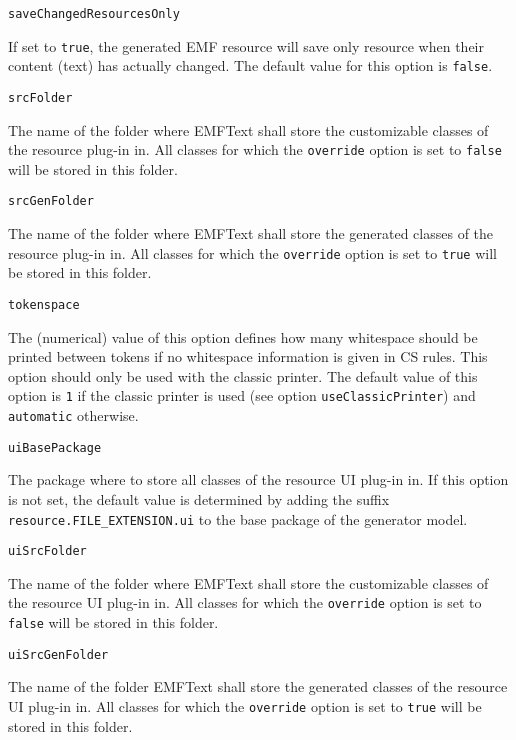 \noindent\texttt{saveChangedResourcesOnly}
\begin{myindentpar}{1cm}
If set to \texttt{true}, the generated EMF resource will save only resource when their content (text) has actually changed. The default value for this option is \texttt{false}.
\end{myindentpar}

\noindent\texttt{srcFolder}
\begin{myindentpar}{1cm}
The name of the folder where EMFText shall store the customizable classes of the resource plug-in in. All classes for which the \texttt{override} option is set to \texttt{false} will be stored in this folder.
\end{myindentpar}

\noindent\texttt{srcGenFolder}
\begin{myindentpar}{1cm}
The name of the folder where EMFText shall store the generated classes of the resource plug-in in. All classes for which the \texttt{override} option is set to \texttt{true} will be stored in this folder.
\end{myindentpar}

\noindent\texttt{tokenspace}
\begin{myindentpar}{1cm}
The (numerical) value of this option defines how many whitespace should be printed between tokens if no whitespace information is given in CS rules. This option should only be used with the classic printer. The default value of this option is \texttt{1} if the classic printer is used (see option \texttt{useClassicPrinter}) and \texttt{automatic} otherwise.
\end{myindentpar}

\noindent\texttt{uiBasePackage}
\begin{myindentpar}{1cm}
The package where to store all classes of the resource UI plug-in in. If this option is not set, the default value is determined by adding the suffix \texttt{resource.FILE\_EXTENSION.ui} to the base package of the generator model.
\end{myindentpar}

\noindent\texttt{uiSrcFolder}
\begin{myindentpar}{1cm}
The name of the folder where EMFText shall store the customizable classes of the resource UI plug-in in. All classes for which the \texttt{override} option is set to \texttt{false} will be stored in this folder.
\end{myindentpar}

\noindent\texttt{uiSrcGenFolder}
\begin{myindentpar}{1cm}
The name of the folder EMFText shall store the generated classes of the resource UI plug-in in. All classes for which the \texttt{override} option is set to \texttt{true} will be stored in this folder.
\end{myindentpar}

